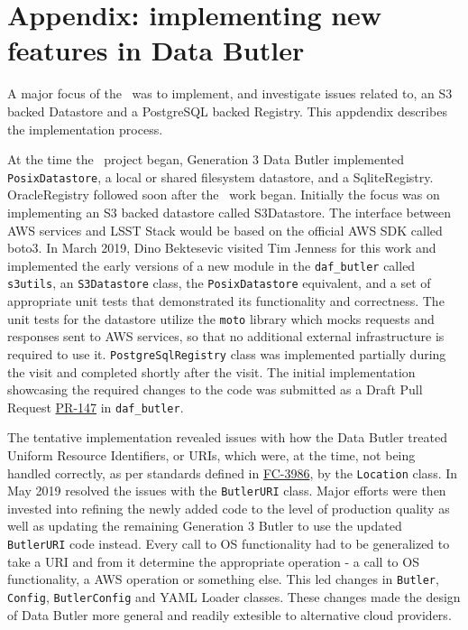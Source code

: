 \section{Appendix: implementing new features in Data Butler}
\label{sec:butler}

A major focus of the \poc~was to implement, and investigate issues related to, an S3 backed Datastore and a PostgreSQL backed Registry.
This appdendix describes the implementation process.

At the time the \poc~project began, Generation 3 Data Butler implemented \texttt{PosixDatastore}, a local or shared filesystem datastore, and a SqliteRegistry.
OracleRegistry followed soon after the \poc~work began.
Initially the focus was on implementing an S3 backed datastore called S3Datastore.
The interface between AWS services and LSST Stack would be based on the official AWS SDK called boto3.
In March 2019, Dino Bektesevic visited Tim Jenness for this work and implemented the early versions of a new module in the \texttt{daf\_butler} called \texttt{s3utils}, an \texttt{S3Datastore} class, the \texttt{PosixDatastore} equivalent, and a set of appropriate unit tests that demonstrated its functionality and correctness.
The unit tests for the datastore utilize the \texttt{moto} library which mocks requests and responses sent to AWS services, so that no additional external infrastructure is required to use it.
\texttt{PostgreSqlRegistry} class was implemented partially during the visit and completed shortly after the visit.
The initial implementation showcasing the required changes to the code was submitted as a Draft Pull Request \href{https://github.com/lsst/daf_butler/pull/147}{PR-147} in \texttt{daf\_butler}.

The tentative implementation revealed issues with how the Data Butler treated Uniform Resource Identifiers, or URIs, which were, at the time, not being handled correctly, as per standards defined in \href{https://tools.ietf.org/html/rfc3986}{FC-3986}, by the \texttt{Location} class.
In May 2019  resolved the issues with the \texttt{ButlerURI} class.
Major efforts were then invested into refining the newly added code to the level of production quality as well as updating the remaining Generation 3 Butler to use the updated \texttt{ButlerURI} code instead.
Every call to OS functionality had to be generalized to take a URI and from it determine the appropriate operation - a call to OS functionality, a AWS operation or something else.
This led changes in \texttt{Butler}, \texttt{Config}, \texttt{ButlerConfig} and YAML Loader classes.
These changes made the design of Data Butler more general and readily extesible to alternative cloud providers.

